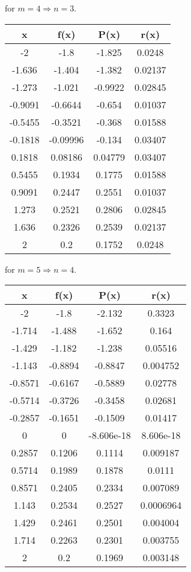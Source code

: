 \documentclass{article}
\begin{document}
for $ m = 4\Rightarrow n = 3 $.
\begin{center}\begin{tabular}{|c|c|c|c|}
\hline
x &f(x) &P(x) &r(x)\\\hline 
-2 &-1.8 &-1.825 &0.0248 \\\hline 
-1.636 &-1.404 &-1.382 &0.02137 \\\hline 
-1.273 &-1.021 &-0.9922 &0.02845 \\\hline 
-0.9091 &-0.6644 &-0.654 &0.01037 \\\hline 
-0.5455 &-0.3521 &-0.368 &0.01588 \\\hline 
-0.1818 &-0.09996 &-0.134 &0.03407 \\\hline 
0.1818 &0.08186 &0.04779 &0.03407 \\\hline 
0.5455 &0.1934 &0.1775 &0.01588 \\\hline 
0.9091 &0.2447 &0.2551 &0.01037 \\\hline 
1.273 &0.2521 &0.2806 &0.02845 \\\hline 
1.636 &0.2326 &0.2539 &0.02137 \\\hline 
2 &0.2 &0.1752 &0.0248 \\\hline 
\end{tabular}
\end{center}

for $ m = 5\Rightarrow n = 4 $.
\begin{center}\begin{tabular}{|c|c|c|c|}
\hline
x &f(x) &P(x) &r(x)\\\hline 
-2 &-1.8 &-2.132 &0.3323 \\\hline 
-1.714 &-1.488 &-1.652 &0.164 \\\hline 
-1.429 &-1.182 &-1.238 &0.05516 \\\hline 
-1.143 &-0.8894 &-0.8847 &0.004752 \\\hline 
-0.8571 &-0.6167 &-0.5889 &0.02778 \\\hline 
-0.5714 &-0.3726 &-0.3458 &0.02681 \\\hline 
-0.2857 &-0.1651 &-0.1509 &0.01417 \\\hline 
0 &0 &-8.606e-18 &8.606e-18 \\\hline 
0.2857 &0.1206 &0.1114 &0.009187 \\\hline 
0.5714 &0.1989 &0.1878 &0.0111 \\\hline 
0.8571 &0.2405 &0.2334 &0.007089 \\\hline 
1.143 &0.2534 &0.2527 &0.0006964 \\\hline 
1.429 &0.2461 &0.2501 &0.004004 \\\hline 
1.714 &0.2263 &0.2301 &0.003755 \\\hline 
2 &0.2 &0.1969 &0.003148 \\\hline 
\end{tabular}
\end{center}
\end{document}
